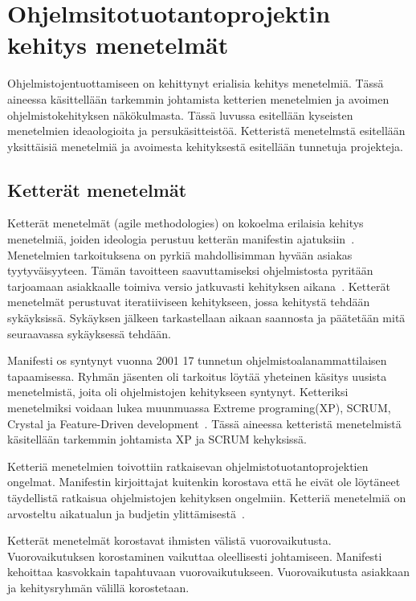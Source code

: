 \documentclass[finnish]{tktltiki2}
\theoremstyle{definition}
\theoremstyle{remark}
\begin{document}
\section{Ohjelmsitotuotantoprojektin kehitys menetelmät}

Ohjelmistojentuottamiseen on kehittynyt erialisia kehitys menetelmiä. Tässä aineessa käsittellään tarkemmin johtamista ketterien menetelmien ja avoimen ohjelmistokehityksen näkökulmasta. Tässä luvussa esitellään kyseisten menetelmien ideaologioita ja persukäsitteistöä. Ketteristä menetelmstä esitellään yksittäisiä menetelmiä ja avoimesta kehityksestä esitellään tunnetuja projekteja.

\subsection{Ketterät menetelmät}



Ketterät menetelmät (agile methodologies) on kokoelma erilaisia kehitys menetelmiä, joiden ideologia perustuu ketterän manifestin ajatuksiin~\cite{fowler2001agile}. Menetelmien tarkoituksena on pyrkiä mahdollisimman hyvään asiakas tyytyväisyyteen. Tämän tavoitteen saavuttamiseksi ohjelmistosta pyritään tarjoamaan asiakkaalle toimiva versio jatkuvasti kehityksen aikana~\cite{fowler2001agile}. Ketterät menetelmät perustuvat iteratiiviseen kehitykseen, jossa kehitystä tehdään sykäyksissä. Sykäyksen jälkeen tarkastellaan aikaan saannosta ja päätetään mitä seuraavassa sykäyksessä tehdään. 

Manifesti os syntynyt vuonna 2001 17 tunnetun ohjelmistoalanammattilaisen tapaamisessa. Ryhmän jäsenten oli tarkoitus löytää yheteinen käsitys uusista menetelmistä, joita oli ohjelmistojen kehitykseen syntynyt. Ketteriksi menetelmiksi voidaan lukea muunmuassa Extreme programing(XP), SCRUM, Crystal  ja Feature-Driven development~\cite{fowler2001agile}. Tässä aineessa ketteristä menetelmistä käsitellään tarkemmin johtamista XP ja SCRUM kehyksissä. 

Ketteriä menetelmien toivottiin ratkaisevan ohjelmistotuotantoprojektien ongelmat. Manifestin kirjoittajat kuitenkin korostava että he eivät ole löytäneet täydellistä ratkaisua ohjelmistojen kehityksen ongelmiin. Ketteriä menetelmiä on arvosteltu aikatualun ja budjetin ylittämisestä~\cite{Guo:2008:SSP:1414004.1414046}.   

Ketterät menetelmät korostavat ihmisten välistä vuorovaikutusta. Vuorovaikutuksen korostaminen vaikuttaa oleellisesti johtamiseen. Manifesti kehoittaa kasvokkain tapahtuvaan vuorovaikutukseen. Vuorovaikutusta asiakkaan ja kehitysryhmän välillä korostetaan.
\end{document}
